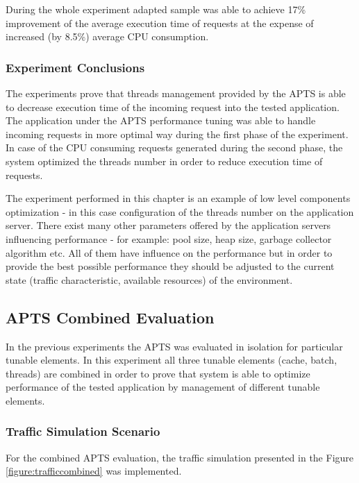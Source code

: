 \documentclass[12pt,a4paper]{article}
\begin{document}
During the whole experiment adapted sample was able to achieve 17\% improvement of the average execution time of requests at the expense of increased (by 8.5\%) average CPU consumption. 

\subsubsection{Experiment Conclusions} 

The experiments prove that threads management provided by the APTS is able to decrease execution time of the incoming request into the tested application. The application under the APTS performance tuning was able to handle incoming requests in more optimal way during the first phase of the experiment. In case of the CPU consuming requests generated during the second phase, the system optimized the threads number in order to reduce execution time of requests. 

The experiment performed in this chapter is an example of low level components optimization - in this case configuration of the threads number on the application server. There exist many other parameters offered by the application servers influencing performance - for example: pool size, heap size, garbage collector algorithm etc. All of them have influence on the performance but in order to provide the best possible performance they should be adjusted to the current state (traffic characteristic, available resources) of the environment. 


\subsection{APTS Combined Evaluation}

In the previous experiments the APTS was evaluated in isolation for particular tunable elements. In this experiment all three tunable elements (cache, batch, threads) are combined in order to prove that system is able to optimize performance  of the tested application by management of different tunable elements.   

\subsubsection{Traffic Simulation Scenario} 

For the combined APTS evaluation, the traffic simulation presented in the Figure \ref{figure:trafficcombined} was implemented. 
\end{document}
